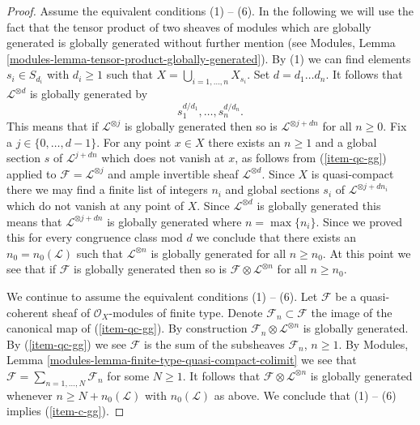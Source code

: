 \documentclass{stacks-project}
\theoremstyle{plain}
\theoremstyle{definition}
\theoremstyle{remark}
\numberwithin{equation}{subsection}
\begin{document}
\begin{proof}
\medskip\noindent
Assume the equivalent conditions (1) -- (6). In the following
we will use the fact that the tensor product of two sheaves of
modules which are globally generated is globally generated without
further mention (see
Modules, Lemma \ref{modules-lemma-tensor-product-globally-generated}).
By (1) we can find elements $s_i \in S_{d_i}$ with $d_i \geq 1$
such that $X = \bigcup_{i = 1, \ldots, n} X_{s_i}$.
Set $d = d_1\ldots d_n$. It follows that $\mathcal{L}^{\otimes d}$
is globally generated by
$$
s_1^{d/d_1}, \ldots, s_n^{d/d_n}.
$$
This means that if $\mathcal{L}^{\otimes j}$ is globally generated
then so is $\mathcal{L}^{\otimes j + dn}$ for all $n \geq 0$.
Fix a $j \in \{0, \ldots, d - 1\}$. For any point $x \in X$ there
exists an $n \geq 1$ and a global section $s$ of $\mathcal{L}^{j + dn}$
which does not vanish at $x$, as follows from (\ref{item-qc-gg}) applied
to $\mathcal{F} = \mathcal{L}^{\otimes j}$ and ample invertible
sheaf $\mathcal{L}^{\otimes d}$. Since $X$ is quasi-compact there
we may find a finite list of integers $n_i$ and global sections
$s_i$ of $\mathcal{L}^{\otimes j + dn_i}$ which do not vanish at any point
of $X$. Since $\mathcal{L}^{\otimes d}$ is globally generated this means that
$\mathcal{L}^{\otimes j + dn}$ is globally generated where $n = \max\{n_i\}$.
Since we proved this for every congruence class mod $d$ we
conclude that there exists an $n_0 = n_0(\mathcal{L})$ such that
$\mathcal{L}^{\otimes n}$ is globally generated for all $n \geq n_0$.
At this point we see that if $\mathcal{F}$ is globally generated then
so is $\mathcal{F} \otimes \mathcal{L}^{\otimes n}$ for all
$n \geq n_0$.

\medskip\noindent
We continue to assume the equivalent conditions (1) -- (6).
Let $\mathcal{F}$ be a quasi-coherent
sheaf of $\mathcal{O}_X$-modules of finite type.
Denote $\mathcal{F}_n \subset \mathcal{F}$ the image of the canonical
map of (\ref{item-qc-gg}). By construction
$\mathcal{F}_n \otimes \mathcal{L}^{\otimes n}$ is
globally generated. By (\ref{item-qc-gg}) we see
$\mathcal{F}$ is the sum of the subsheaves $\mathcal{F}_n$,
$n \geq 1$. By
Modules, Lemma \ref{modules-lemma-finite-type-quasi-compact-colimit}
we see that $\mathcal{F} = \sum_{n = 1, \ldots, N} \mathcal{F}_n$
for some $N \geq 1$. It follows that
$\mathcal{F} \otimes \mathcal{L}^{\otimes n}$ is globally
generated whenever $n \geq N + n_0(\mathcal{L})$ with $n_0(\mathcal{L})$
as above. We conclude that (1) -- (6) implies (\ref{item-c-gg}).


\end{proof}
\end{document}
